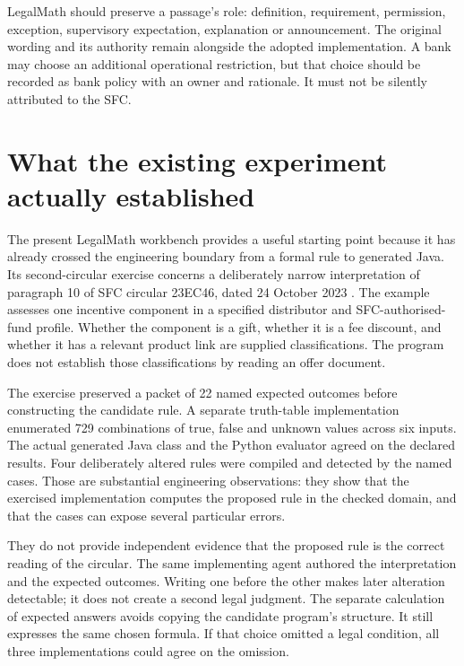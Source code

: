\documentclass[12pt,a4paper,oneside,openany]{book}
\begin{document}
LegalMath should preserve a passage's role: definition, requirement, permission,
exception, supervisory expectation, explanation or announcement. The original
wording and its authority remain alongside the adopted implementation. A bank may
choose an additional operational restriction, but that choice should be recorded
as bank policy with an owner and rationale. It must not be silently attributed to
the SFC.

\section{What the existing experiment actually established}
\label{merge:M01:01}

\label{sec:problem-evidence}
The present LegalMath workbench provides a useful starting point because it has
already crossed the engineering boundary from a formal rule to generated Java.
Its second-circular exercise concerns a deliberately narrow interpretation of
paragraph 10 of SFC circular 23EC46, dated 24 October 2023
\citep{sfcmarketing}. The example assesses one incentive component in a specified
distributor and SFC-authorised-fund profile. Whether the component is a gift,
whether it is a fee discount, and whether it has a relevant product link are
supplied classifications. The program does not establish those classifications
by reading an offer document.

The exercise preserved a packet of 22 named expected outcomes before constructing
the candidate rule. A separate truth-table implementation enumerated 729
combinations of true, false and unknown values across six inputs. The actual
generated Java class and the Python evaluator agreed on the declared results.
Four deliberately altered rules were compiled and detected by the named cases.
Those are substantial engineering observations: they show that the exercised
implementation computes the proposed rule in the checked domain, and that the
cases can expose several particular errors.

They do not provide independent evidence that the proposed rule is the correct
reading of the circular. The same implementing agent authored the interpretation
and the expected outcomes. Writing one before the other makes later alteration
detectable; it does not create a second legal judgment. The separate calculation
of expected answers avoids copying the candidate program's structure. It still
expresses the same chosen formula. If that choice omitted a legal condition,
all three implementations could agree on the omission.
\end{document}
